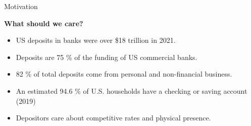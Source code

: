 \documentclass[notes,11pt, aspectratio=169]{beamer}
\begin{document}
\begin{frame}{Motivation}

  \textbf{What should we care?}
  \vspace{0.3cm}
  \begin{itemize}
  
     \item US deposits in banks were over \$18 trillion in 2021.
      \item Deposits are 75 \% of the funding of US commercial banks. 
          \vspace{0.1cm}
      \item 82 \% of total deposits come from personal and non-financial business.
          \vspace{0.1cm}
    
      \item An estimated 94.6 \% of U.S. households have a checking or saving account (2019)
      \vspace{0.1cm}
      \item Depositors care about competitive rates and physical presence.
  \end{itemize}


\end{frame}
\end{document}

